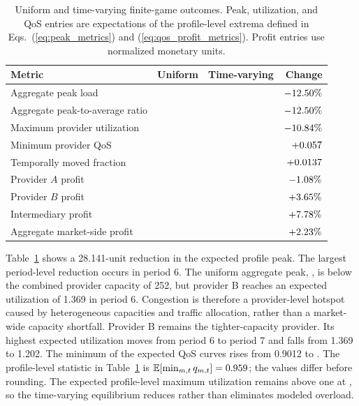 \documentclass[11pt,a4paper]{article}
\begin{document}
\begin{table}[H]
\centering
\caption{Uniform and time-varying finite-game outcomes. Peak, utilization, and QoS entries are expectations of the profile-level extrema defined in Eqs.~(\ref{eq:peak_metrics}) and (\ref{eq:qos_profit_metrics}). Profit entries use normalized monetary units.}
\label{tab:main_results}
\small
\begin{tabular}{@{}lrrr@{}}
\toprule
Metric & Uniform & Time-varying & Change \\
\midrule
Aggregate peak load & \UniformAggregatePeak{} & \DynamicAggregatePeak{} & $-12.50\%$ \\
Aggregate peak-to-average ratio & \UniformPeakToAverage{} & \DynamicPeakToAverage{} & $-12.50\%$ \\
Maximum provider utilization & \UniformMaximumUtilisation{} & \DynamicMaximumUtilisation{} & $-10.84\%$ \\
Minimum provider QoS & \UniformMinimumQoS{} & \DynamicMinimumQoS{} & $+0.057$ \\
Temporally moved fraction & \UniformMovedFraction{} & \DynamicMovedFraction{} & $+0.0137$ \\
Provider $A$ profit & \UniformProviderAProfit{} & \DynamicProviderAProfit{} & $-1.08\%$ \\
Provider $B$ profit & \UniformProviderBProfit{} & \DynamicProviderBProfit{} & $+3.65\%$ \\
Intermediary profit & \UniformIntermediaryProfit{} & \DynamicIntermediaryProfit{} & $+7.78\%$ \\
Aggregate market-side profit & \UniformMarketProfit{} & \DynamicMarketProfit{} & $+2.23\%$ \\
\bottomrule
\end{tabular}
\end{table}

Table~\ref{tab:main_results} shows a 28.141-unit reduction in the expected profile peak. The largest period-level reduction occurs in period 6. The uniform aggregate peak, \UniformAggregatePeak{}, is below the combined provider capacity of 252, but provider B reaches an expected utilization of 1.369 in period 6. Congestion is therefore a provider-level hotspot caused by heterogeneous capacities and traffic allocation, rather than a market-wide capacity shortfall. Provider B remains the tighter-capacity provider. Its highest expected utilization moves from period 6 to period 7 and falls from 1.369 to 1.202. The minimum of the expected QoS curves rises from 0.9012 to \DynamicMinimumQoS{}. The profile-level statistic in Table~\ref{tab:main_results} is $\mathbb E[\min_{m,t}q_{m,t}]=0.959$; the values differ before rounding. The expected profile-level maximum utilization remains above one at \DynamicMaximumUtilisation{}, so the time-varying equilibrium reduces rather than eliminates modeled overload.
\end{document}
